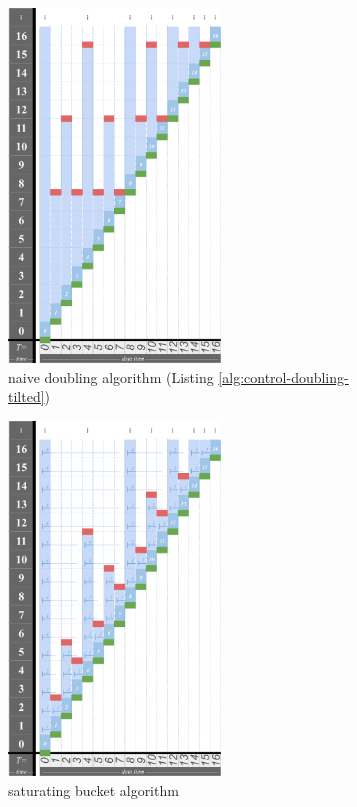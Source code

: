 \begin{figure}
\begin{subfigure}{0.345\linewidth}
\centering
\includegraphics[height=3.7in]{img/surface-control-tall-zhao-tilted-doubling-naive}
\centering
\caption{naive doubling algorithm (Listing \ref{alg:control-doubling-tilted})}
\label{fig:surface-control-tilted:naive-doubling}
\end{subfigure}%
\begin{subfigure}{0.295\linewidth}
\centering
\includegraphics[height=3.7in,trim={2.5cm 0 0 0},clip]{img/surface-control-tall-zhao}
\centering
\caption{saturating bucket algorithm \citep{zhao2005generalized}}
\label{fig:surface-control-tilted:pyrimidal}
\end{subfigure}%
\begin{subfigure}{0.37\linewidth}

\end{subfigure}
\end{figure}
